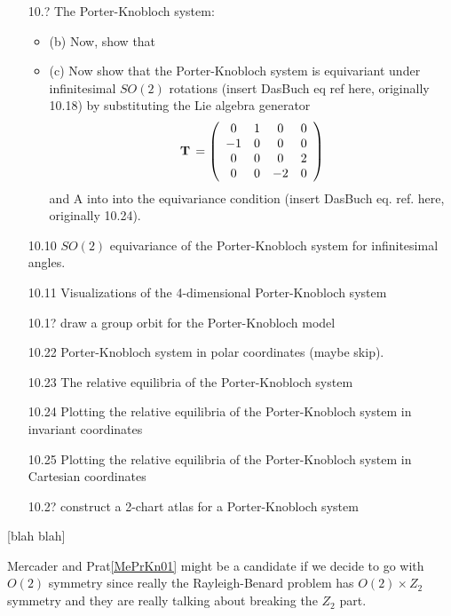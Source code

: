 \documentclass{article}
\begin{document}
\begin{itemize}
	\item[10.?] The Porter-Knobloch system:
		\begin{itemize}
			
			\item(b) Now, show that 

\item(c) Now show that the Porter-Knobloch system is equivariant under infinitesimal $SO(2)$ rotations
({insert DasBuch eq ref here, originally 10.18}) by substituting the Lie algebra generator
    \begin{equation}
\mathbf{T}  \, =
\left( \begin{array}{cccc}
         0 & 1 & 0 & 0 \\
        -1 & 0 & 0 & 0 \\
         0 & 0 & 0 & 2\\
         0 & 0 & -2 & 0
      \end{array} \right)
\label{{LGTwoMode}}
\end{equation}
and A into into the equivariance condition ({insert DasBuch
eq. ref. here, originally 10.24}).
\end{itemize}

  \item[10.10] $SO(2)$ equivariance of the Porter-Knobloch system
           for infinitesimal angles.
  \item[10.11] Visualizations of the 4-dimensional Porter-Knobloch system
  \item[10.1?] draw a group orbit for the Porter-Knobloch model
  \item[10.22] Porter-Knobloch system in polar coordinates (maybe skip).
  \item[10.23] The relative equilibria of the Porter-Knobloch system
  \item[10.24] Plotting the relative equilibria of
           the Porter-Knobloch system in invariant coordinates
  \item[10.25] Plotting the relative equilibria of
           the Porter-Knobloch system in Cartesian coordinates
  \item[10.2?] construct a 2-chart atlas for a Porter-Knobloch system
\end{itemize}


 [blah blah]

Mercader and Prat\ref{MePrKn01} might
be a candidate if we decide to go with $O(2)$ symmetry since really the
Rayleigh-Benard problem has $O(2) \times Z_2$ symmetry and they are really
talking about breaking the $Z_2$ part.
\end{document}
